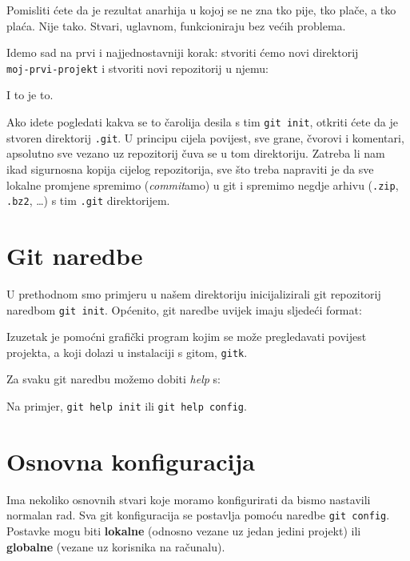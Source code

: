 Pomisliti ćete da je rezultat anarhija u kojoj se ne zna tko pije, tko plače, a tko plaća. 
Nije tako.
Stvari, uglavnom, funkcioniraju bez većih problema.

Idemo sad na prvi i najjednostavniji korak: stvoriti ćemo novi direktorij \\ \verb+moj-prvi-projekt+ i stvoriti novi repozitorij u njemu:



I to je to. 

Ako idete pogledati kakva se to čarolija desila s tim \verb+git init+, otkriti ćete da je stvoren direktorij \verb+.git+.
U principu cijela povijest, sve grane, čvorovi i komentari, apsolutno sve vezano uz repozitorij čuva se u tom direktoriju.
Zatreba li nam ikad sigurnosna kopija cijelog repozitorija, sve što treba napraviti je da sve lokalne promjene spremimo (\emph{commit}amo) u git i spremimo negdje arhivu (\verb+.zip+, \verb+.bz2+, \dots) s tim \verb+.git+ direktorijem.

\section*{Git naredbe}

U prethodnom smo primjeru u našem direktoriju inicijalizirali git repozitorij naredbom \verb+git init+.
Općenito, git naredbe uvijek imaju sljedeći format:

\gitoutput{
\color{blue}{git $<$naredba$>$ $<$opcija1$>$ $<$opcija2$>$ \dots}
}

Izuzetak je pomoćni grafički program kojim se može pregledavati povijest projekta, a koji dolazi u instalaciji s gitom, \verb+gitk+.

Za svaku git naredbu možemo dobiti \emph{help} s:


Na primjer, \verb+git help init+ ili \verb+git help config+.

\section*{Osnovna konfiguracija}

Ima nekoliko osnovnih stvari koje moramo konfigurirati da bismo nastavili normalan rad. 
Sva git konfiguracija se postavlja pomoću naredbe \verb+git config+. 
Postavke mogu biti \textbf{lokalne} (odnosno vezane uz jedan jedini projekt) ili \textbf{globalne} (vezane uz korisnika na računalu).

